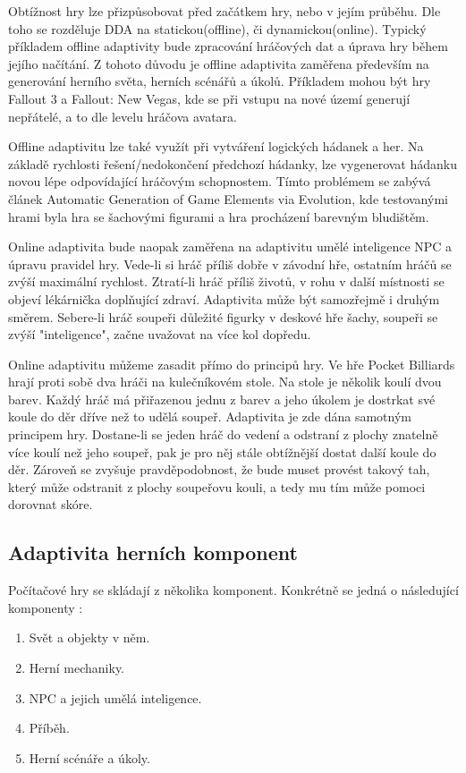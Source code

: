 Obtížnost hry lze přizpůsobovat před začátkem hry, nebo v jejím průběhu. Dle toho se rozděluje DDA na statickou(offline), či dynamickou(online). Typický příkladem offline adaptivity bude zpracování hráčových dat a úprava hry během jejího načítání. Z tohoto důvodu je offline adaptivita zaměřena především na generování herního světa, herních scénářů a úkolů\cite{16Survey}. Příkladem mohou být hry Fallout 3 a Fallout: New Vegas\cite{fallout}, kde se při vstupu na nové území generují nepřátelé, a to dle levelu hráčova avatara. 

Offline adaptivitu lze také využít při vytváření logických hádanek a her. Na základě rychlosti řešení/nedokončení předchozí hádanky, lze vygenerovat hádanku novou lépe odpovídající hráčovým schopnostem. Tímto problémem se zabývá článek Automatic Generation of Game Elements via Evolution\cite{17Evol}, kde testovanými hrami byla hra se šachovými figurami a hra procházení barevným bludištěm.

Online adaptivita bude naopak zaměřena na adaptivitu umělé inteligence NPC a úpravu pravidel hry. Vede-li si hráč příliš dobře v závodní hře, ostatním hráčů se zvýší maximální rychlost. Ztratí-li hráč příliš životů, v rohu v další místnosti se objeví lékárnička doplňující zdraví. Adaptivita může být samozřejmě i druhým směrem. Sebere-li hráč soupeři důležité figurky v deskové hře šachy, soupeři se zvýší "inteligence", začne uvažovat na více kol dopředu. 

Online adaptivitu můžeme zasadit přímo do principů hry. Ve hře Pocket Billiards hrají proti sobě dva hráči na kulečníkovém stole. Na stole je několik koulí dvou barev. Každý hráč má přiřazenou jednu z barev a jeho úkolem je dostrkat své koule do děr dříve než to udělá soupeř. Adaptivita je zde dána samotným principem hry. Dostane-li se jeden hráč do vedení a odstraní z plochy znatelně více koulí než jeho soupeř, pak je pro něj stále obtížnější dostat další koule do děr. Zároveň se zvyšuje pravděpodobnost, že bude muset provést takový tah, který může odstranit z plochy soupeřovu kouli, a tedy mu tím může pomoci dorovnat skóre\cite{5}.

\subsection{Adaptivita herních komponent}

Počítačové hry se skládají z několika komponent. Konkrétně se jedná o následující komponenty \cite{16Survey} : 

\begin{enumerate}
	\item Svět a objekty v něm.
	\item Herní mechaniky.
	\item NPC a jejich umělá inteligence.
	\item Příběh.
	\item Herní scénáře a úkoly.
\end{enumerate}

